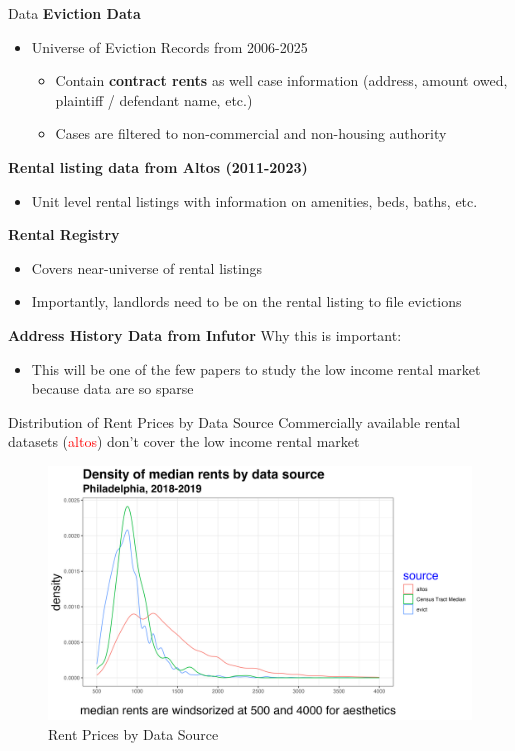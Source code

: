 \documentclass[10pt, xcolor=dvipsnames]{beamer}
\begin{document}
\begin{frame}{Data}
\textbf{Eviction Data}
    \begin{itemize}
        \item Universe of Eviction Records from 2006-2025
        \begin{itemize}
            \item Contain \textbf{contract rents} as well case information (address, amount owed, plaintiff / defendant name, etc.)
            \item Cases are filtered to non-commercial and non-housing authority
        \end{itemize}
    \end{itemize}
\pause
\textbf{Rental listing data from Altos (2011-2023)}
\begin{itemize}
    \item Unit level rental listings with information on amenities, beds, baths, etc.
\end{itemize}
\textbf{ Rental Registry}
\begin{itemize}
    \item Covers near-universe of rental listings
    \item Importantly, landlords need to be on the rental listing to file evictions
\end{itemize}
\textbf{Address History Data from Infutor}
    \pause
Why this is important:\\
    \begin{itemize}
        \item This will be one of the few papers to study the low income rental market because data are so sparse 
    \end{itemize}
\end{frame}

\begin{frame}{Distribution of Rent Prices by Data Source}
Commercially available rental datasets (\textcolor{red}{altos}) don't cover the low income rental market\\
    \begin{figure}
        \centering
        \includegraphics[width=0.75\linewidth]{figs/density_rent_prices.png}
        \caption{Rent Prices by Data Source}
        \label{fig:rent-dist}
    \end{figure}
\end{frame}
\end{document}

